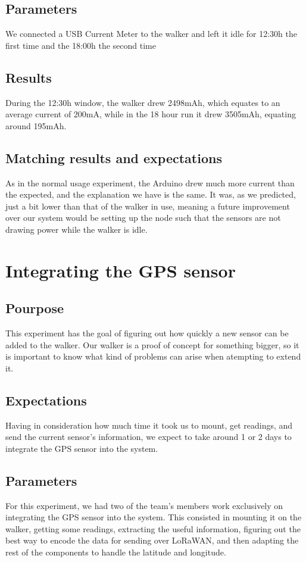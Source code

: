 	\subsection{Parameters}
		We connected a USB Current Meter to the walker and left it idle for 12:30h the first time and the 18:00h the second time
	\subsection{Results}
		During the 12:30h window, the walker drew 2498mAh, which equates to an average current of 200mA, while in the 18 hour run it drew 3505mAh, equating around 195mAh.
	\subsection{Matching results and expectations}
		As in the normal usage experiment, the Arduino drew much more current than the expected, and the explanation we have is the same. It was, as we predicted, just a bit lower than that of the walker in use, meaning a future improvement over our system would be setting up the node such that the sensors are not drawing power while the walker is idle.

\section{Integrating the GPS sensor}
	\subsection{Pourpose}
	This experiment has the goal of figuring out how quickly a new sensor can be added to the walker. Our walker is a proof of concept for something bigger, so it is important to know what kind of problems can arise when atempting to extend it.

	\subsection{Expectations}
	Having in consideration how much time it took us to mount, get readings, and send the current sensor's information, we expect to take around 1 or 2 days to integrate the GPS sensor into the system. 

	\subsection{Parameters}
	For this experiment, we had two of the team's members work exclusively on integrating the GPS sensor into the system. This consisted in mounting it on the walker, getting some readings, extracting the useful information, figuring out the best way to encode the data for sending over LoRaWAN, and then adapting the rest of the components to handle the latitude and longitude.

